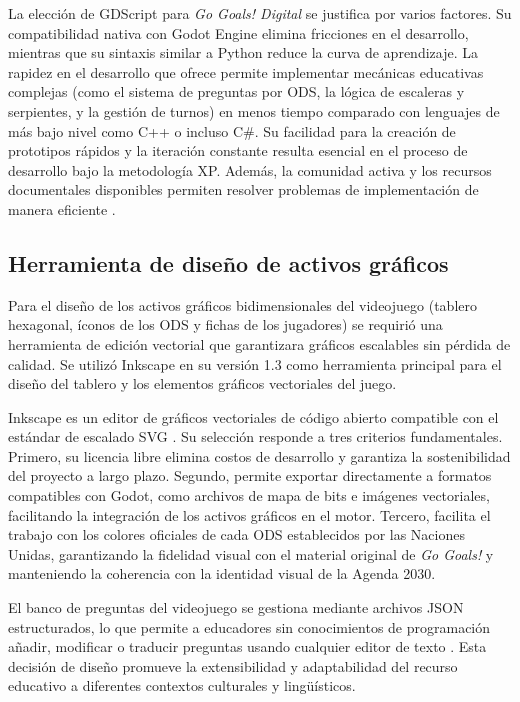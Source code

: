 La elección de GDScript para \textit{Go Goals! Digital} se justifica por varios factores. Su compatibilidad nativa con Godot Engine elimina fricciones en el desarrollo, mientras que su sintaxis similar a Python reduce la curva de aprendizaje. La rapidez en el desarrollo que ofrece permite implementar mecánicas educativas complejas (como el sistema de preguntas por ODS, la lógica de escaleras y serpientes, y la gestión de turnos) en menos tiempo comparado con lenguajes de más bajo nivel como C++ o incluso C\#. Su facilidad para la creación de prototipos rápidos y la iteración constante resulta esencial en el proceso de desarrollo bajo la metodología XP. Además, la comunidad activa y los recursos documentales disponibles permiten resolver problemas de implementación de manera eficiente \parencite{GodotDocs2026}.

\subsection{Herramienta de diseño de activos gráficos}
\label{subsec:inkscape}

Para el diseño de los activos gráficos bidimensionales del videojuego (tablero hexagonal, íconos de los ODS y fichas de los jugadores) se requirió una herramienta de edición vectorial que garantizara gráficos escalables sin pérdida de calidad. Se utilizó Inkscape en su versión 1.3 como herramienta principal para el diseño del tablero y los elementos gráficos vectoriales del juego.

Inkscape es un editor de gráficos vectoriales de código abierto compatible con el estándar de escalado SVG \parencite{InkscapeDocs2023}. Su selección responde a tres criterios fundamentales. Primero, su licencia libre elimina costos de desarrollo y garantiza la sostenibilidad del proyecto a largo plazo. Segundo, permite exportar directamente a formatos compatibles con Godot, como archivos de mapa de bits e imágenes vectoriales, facilitando la integración de los activos gráficos en el motor. Tercero, facilita el trabajo con los colores oficiales de cada ODS establecidos por las Naciones Unidas, garantizando la fidelidad visual con el material original de \textit{Go Goals!} y manteniendo la coherencia con la identidad visual de la Agenda 2030.

El banco de preguntas del videojuego se gestiona mediante archivos JSON estructurados, lo que permite a educadores sin conocimientos de programación añadir, modificar o traducir preguntas usando cualquier editor de texto \parencite{GodotDocs2026}. Esta decisión de diseño promueve la extensibilidad y adaptabilidad del recurso educativo a diferentes contextos culturales y lingüísticos.

